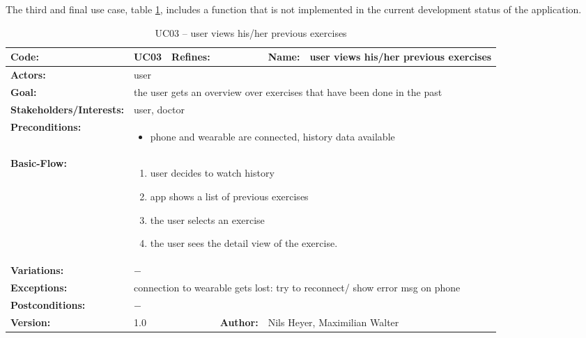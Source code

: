 \clearpage

The third and final use case, table \ref{history}, includes a function that is not implemented in the current development status of the application.
\begin{table}[H]
	\begin{tabular}{|l|l|l|l|l|l|} \hline
		\textbf{Code:} & UC03 & \textbf{Refines:} &  & \textbf{Name:} & user views his/her previous exercises \\ \hline
		\textbf{Actors:} & \multicolumn{5}{l|}{user} \\ \hline
		\textbf{Goal:} & \multicolumn{5}{l|}{the user gets an overview over exercises that have been done in the past} \\ \hline
		\textbf{Stakeholders/Interests:} & \multicolumn{5}{l|}{user, doctor} \\ \hline
		\textbf{Preconditions:} & \multicolumn{5}{l|}{\parbox{0.75\textwidth}{
			\begin{itemize}
				\item phone and wearable are connected, history data available
			\end{itemize}
		}} \\ \hline
		\textbf{Basic-Flow:} & \multicolumn{5}{l|}{\parbox{0.75\textwidth}{
			\begin{enumerate}
				\item user decides to watch history
				\item app shows a list of previous exercises
				\item the user selects an exercise
				\item the user sees the detail view of the exercise.
			\end{enumerate}
		}} \\ \hline
		\textbf{Variations:} & \multicolumn{5}{l|}{\parbox{0.75\textwidth}{
			$-$
		}} \\ \hline
		\textbf{Exceptions:} & \multicolumn{5}{l|}{\parbox{0.75\textwidth}{
			connection to wearable gets lost: try to reconnect/ show error msg on phone
		}} \\ \hline
		\textbf{Postconditions:} & \multicolumn{5}{l|}{$-$} \\ \hline
		\textbf{Version:} & \multicolumn{2}{l|}{1.0} & \textbf{Author:} & \multicolumn{2}{l|}{Nils Heyer, Maximilian Walter} \\ \hline
	\end{tabular}
	\caption{UC03 -- user views his/her previous exercises}
	\label{history}
\end{table}

